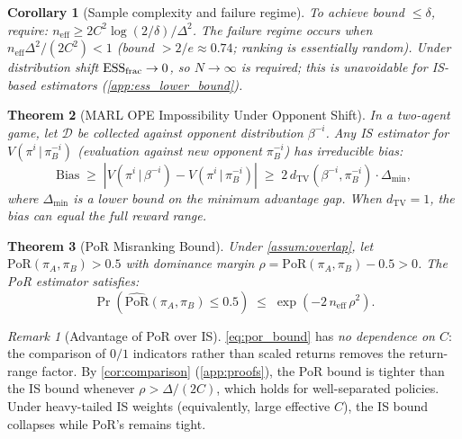 \documentclass[10pt]{article}
\theoremstyle{plain}
\newtheorem{theorem}{Theorem}
\newtheorem{corollary}[theorem]{Corollary}
\theoremstyle{definition}
\theoremstyle{remark}
\newtheorem{remark}{Remark}
\newcommand{\PoR}{\mathrm{PoR}}
\newcommand{\ESS}{\mathrm{ESS}}
\newcommand{\neff}{n_{\mathrm{eff}}}
\newcommand{\TV}{d_{\mathrm{TV}}}
\newcommand{\piA}{\pi_A}
\newcommand{\piB}{\pi_B}
\newcommand{\calD}{\mathcal{D}}
\begin{document}
\begin{corollary}[Sample complexity and failure regime]
  \label{cor:sample_complexity}
  To achieve bound $\leq\delta$, require:
  $\neff\geq 2C^2\log(2/\delta)/\Delta^2$.
  The \emph{failure regime} occurs when $\neff\Delta^2/(2C^2)<1$
  (bound $>2/e\approx0.74$; ranking is essentially random).
  Under distribution shift $\ESS_{\rm frac}\to 0$, so $N\to\infty$ is required;
  this is unavoidable for IS-based estimators (\cref{app:ess_lower_bound}).
\end{corollary}

\begin{theorem}[MARL OPE Impossibility Under Opponent Shift]
  \label{thm:marl}
  In a two-agent game, let $\calD$ be collected against opponent distribution
  $\beta^{-i}$.  Any IS estimator for $V(\pi^i\,|\,\pi^{-i}_B)$ (evaluation
  against new opponent $\pi^{-i}_B$) has irreducible bias:
  \begin{equation}
    \mathrm{Bias} \;\geq\; \left|V(\pi^i\,|\,\beta^{-i}) - V(\pi^i\,|\,\pi^{-i}_B)\right|
    \;\geq\; 2\,\TV(\beta^{-i},\pi^{-i}_B)\cdot\Delta_{\min},
    \label{eq:marl_bias}
  \end{equation}
  where $\Delta_{\min}$ is a lower bound on the minimum advantage gap.
  When $\TV=1$, the bias can equal the full reward range.
\end{theorem}

\begin{theorem}[PoR Misranking Bound]
  \label{thm:por}
  Under \cref{assum:overlap}, let $\PoR(\piA,\piB)>0.5$ with dominance margin
  $\rho=\PoR(\piA,\piB)-0.5>0$.  The PoR estimator satisfies:
  \begin{equation}
    \Pr\!\left(\widehat{\PoR}(\piA,\piB)\leq 0.5\right)
    \;\leq\; \exp\!\left(-2\,\neff\,\rho^2\right).
    \label{eq:por_bound}
  \end{equation}
\end{theorem}

\begin{remark}[Advantage of PoR over IS]
  \eqref{eq:por_bound} has \emph{no dependence on $C$}: the comparison of
  $0/1$ indicators rather than scaled returns removes the return-range
  factor.  By \cref{cor:comparison} (\cref{app:proofs}), the PoR bound is
  tighter than the IS bound whenever $\rho>\Delta/(2C)$, which holds for
  well-separated policies.  Under heavy-tailed IS weights (equivalently,
  large effective $C$), the IS bound collapses while PoR's remains tight.
\end{remark}
\end{document}
